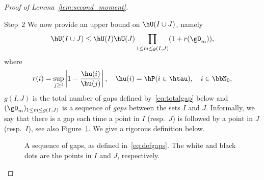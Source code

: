 \begin{proof}[Proof of Lemma~\ref{lem:second_moment}]
\begin{step}{Step~2}
We now provide an upper bound on $\hU(I \cup J)$, namely
\begin{equation}\label{eq:UBhatU}
\hU(I \cup J) \leq \hU(I) \hU(J) \prod_{1 \leq m \leq g(I,J)} (1 + r(\gD_m)),
\end{equation}
where
\begin{equation}
r(i) = \sup_{j \geq i} \left| 1 - \frac{\hu(i)}{\hu(j)} \right|, \quad \hu(i) = \hP(i \in \htau), \quad i \in \bbN_0,
\end{equation}
$g(I,J)$ is the total number of gaps defined by~\eqref{eq:totalgap} below and $(\gD_m)_{1 \leq m \leq g(I,J)}$ is a sequence of \emph{gaps} between the sets $I$ and $J$. Informally, we say that there is a gap each time a point in $I$ (resp.\ $J$) is followed by a point in $J$ (resp.\ $I$), see also Figure~\ref{fig:gaps}. We give a rigorous definition below.

\begin{figure}
\caption{A sequence of gaps, as defined in~\eqref{eq:defgaps}. The white and black dots are the points in $I$ and $J$, respectively.}\label{fig:gaps}
\end{figure}


\end{step}
\end{proof}
